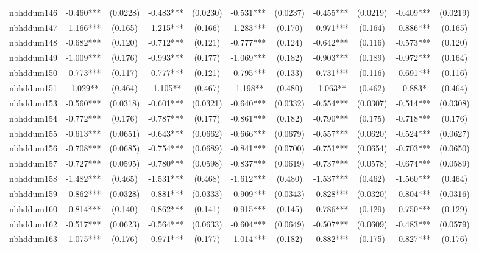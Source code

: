 \documentclass[]{article}
\begin{document}
\begin{tabular}{lcccccccccc}
nbhddum146 & -0.460*** & (0.0228) & -0.483*** & (0.0230) & -0.531*** & (0.0237) & -0.455*** & (0.0219) & -0.409*** & (0.0219) \\
nbhddum147 & -1.166*** & (0.165) & -1.215*** & (0.166) & -1.283*** & (0.170) & -0.971*** & (0.164) & -0.886*** & (0.165) \\
nbhddum148 & -0.682*** & (0.120) & -0.712*** & (0.121) & -0.777*** & (0.124) & -0.642*** & (0.116) & -0.573*** & (0.120) \\
nbhddum149 & -1.009*** & (0.176) & -0.993*** & (0.177) & -1.069*** & (0.182) & -0.903*** & (0.189) & -0.972*** & (0.164) \\
nbhddum150 & -0.773*** & (0.117) & -0.777*** & (0.121) & -0.795*** & (0.133) & -0.731*** & (0.116) & -0.691*** & (0.116) \\
nbhddum151 & -1.029** & (0.464) & -1.105** & (0.467) & -1.198** & (0.480) & -1.063** & (0.462) & -0.883* & (0.464) \\
nbhddum153 & -0.560*** & (0.0318) & -0.601*** & (0.0321) & -0.640*** & (0.0332) & -0.554*** & (0.0307) & -0.514*** & (0.0308) \\
nbhddum154 & -0.772*** & (0.176) & -0.787*** & (0.177) & -0.861*** & (0.182) & -0.790*** & (0.175) & -0.718*** & (0.176) \\
nbhddum155 & -0.613*** & (0.0651) & -0.643*** & (0.0662) & -0.666*** & (0.0679) & -0.557*** & (0.0620) & -0.524*** & (0.0627) \\
nbhddum156 & -0.708*** & (0.0685) & -0.754*** & (0.0689) & -0.841*** & (0.0700) & -0.751*** & (0.0654) & -0.703*** & (0.0650) \\
nbhddum157 & -0.727*** & (0.0595) & -0.780*** & (0.0598) & -0.837*** & (0.0619) & -0.737*** & (0.0578) & -0.674*** & (0.0589) \\
nbhddum158 & -1.482*** & (0.465) & -1.531*** & (0.468) & -1.612*** & (0.480) & -1.537*** & (0.462) & -1.560*** & (0.464) \\
nbhddum159 & -0.862*** & (0.0328) & -0.881*** & (0.0333) & -0.909*** & (0.0343) & -0.828*** & (0.0320) & -0.804*** & (0.0316) \\
nbhddum160 & -0.814*** & (0.140) & -0.862*** & (0.141) & -0.915*** & (0.145) & -0.786*** & (0.129) & -0.750*** & (0.129) \\
nbhddum162 & -0.517*** & (0.0623) & -0.564*** & (0.0633) & -0.604*** & (0.0649) & -0.507*** & (0.0609) & -0.483*** & (0.0579) \\
nbhddum163 & -1.075*** & (0.176) & -0.971*** & (0.177) & -1.014*** & (0.182) & -0.882*** & (0.175) & -0.827*** & (0.176) \\

\end{tabular}
\end{document}
